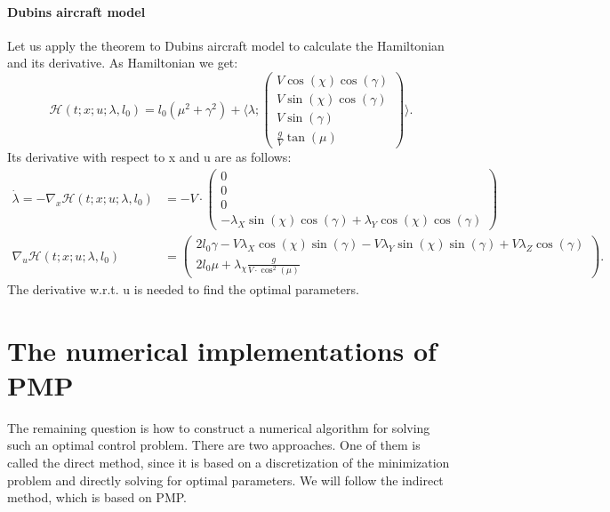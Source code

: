 \documentclass[a4paper]{article}
\theoremstyle{definitions}
\theoremstyle{bemerkung}
\theoremstyle{satz}
\theoremstyle{satz}
\begin{document}
\paragraph{Dubins aircraft model}
Let us apply the theorem to Dubins aircraft model to calculate the Hamiltonian and its derivative. As Hamiltonian we get:
\begin{equation}
    \mathcal{H}(t;x;u;\lambda, l_0) = l_0(\mu^2 + \gamma^2)+\langle\lambda;\begin{pmatrix}
        V \cos(\chi) \cos(\gamma) \\
        V \sin(\chi) \cos(\gamma) \\
        V \sin(\gamma) \\
        \frac{g}{V} \tan({\mu})
    \end{pmatrix} \rangle.
\end{equation}
Its derivative with respect to x and u are as follows:
\begin{align}
    \dot{\lambda} = -\nabla_x \mathcal{H}(t;x;u;\lambda, l_0) &= -V\cdot\begin{pmatrix}
        0\\
        0\\
        0\\
        -\lambda_X \sin(\chi)\cos(\gamma)+\lambda_Y\cos(\chi)\cos(\gamma)
    \end{pmatrix}\\
    \nabla_u \mathcal{H}(t;x;u;\lambda, l_0) &=\begin{pmatrix}
            2l_0\gamma-V\lambda_X \cos(\chi)\sin(\gamma) - V \lambda_Y \sin(\chi)\sin(\gamma)+V\lambda_Z \cos(\gamma)\\
            2l_0\mu+\lambda_{\chi} \frac{g}{V\cdot \cos^2(\mu)}
    \end{pmatrix}.
\end{align}
The derivative w.r.t. u is needed to find the optimal parameters.

\section{The numerical implementations of PMP}
    
The remaining question is how to construct a numerical algorithm for solving such an optimal control problem. There are two approaches. One of them is called the direct method, since it is based on a discretization of the minimization problem and directly solving for optimal parameters. We will follow the indirect method, which is based on PMP.
\end{document}
